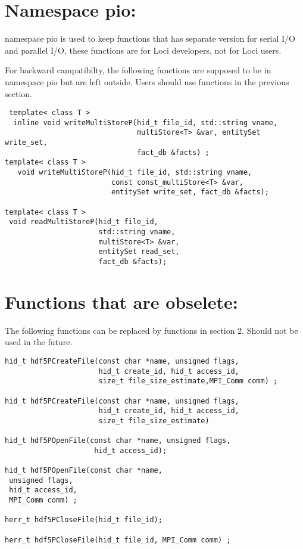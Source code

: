 \documentclass{article}
\begin{document}
\section{Namespace pio:}
namespace pio is used to keep functions that has separate version for serial I/O and
parallel I/O, these functions are for Loci developers, not for Loci users.



For backward campatibilty, the following functions are supposed to be in namespace pio but are left outside. Users should use functions in the previous section. 

\begin{lstlisting}
 template< class T >
  inline void writeMultiStoreP(hid_t file_id, std::string vname,
                               multiStore<T> &var, entitySet write_set,
                               fact_db &facts) ;
template< class T >
   void writeMultiStoreP(hid_t file_id, std::string vname,
                         const const_multiStore<T> &var,
                         entitySet write_set, fact_db &facts); 

template< class T >
 void readMultiStoreP(hid_t file_id,
                      std::string vname,
                      multiStore<T> &var,
                      entitySet read_set,
                      fact_db &facts); 

\end{lstlisting}


 
\section{Functions that are obselete:}
The following functions can be replaced by functions in section 2. Should not be used in the future. 

\begin{lstlisting}
hid_t hdf5PCreateFile(const char *name, unsigned flags,
                      hid_t create_id, hid_t access_id, 
                      size_t file_size_estimate,MPI_Comm comm) ;

hid_t hdf5PCreateFile(const char *name, unsigned flags,
                      hid_t create_id, hid_t access_id, 
                      size_t file_size_estimate)
  
hid_t hdf5POpenFile(const char *name, unsigned flags,
                     hid_t access_id); 

hid_t hdf5POpenFile(const char *name,
 unsigned flags, 
 hid_t access_id,
 MPI_Comm comm) ;

herr_t hdf5PCloseFile(hid_t file_id);      
 
herr_t hdf5PCloseFile(hid_t file_id, MPI_Comm comm) ;
\end{lstlisting}
\end{document}

